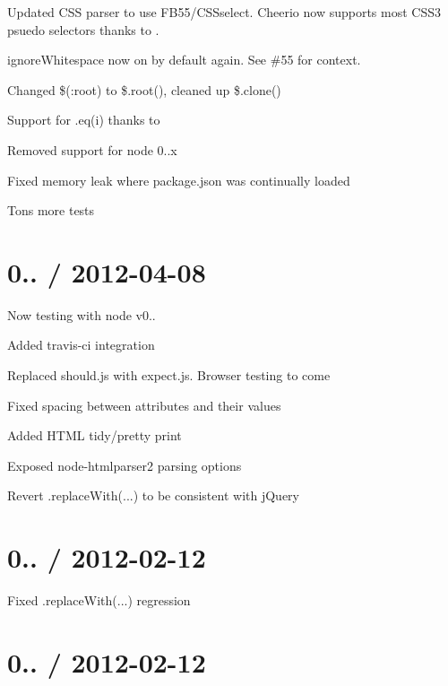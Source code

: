 \begin{DoxyItemize}
\item Updated C\+SS parser to use F\+B55/\+C\+S\+Sselect. Cheerio now supports most C\+S\+S3 psuedo selectors thanks to .
\item ignore\+Whitespace now on by default again. See \#55 for context.
\item Changed \$(\textquotesingle{}\+:root\textquotesingle{}) to \$.root(), cleaned up \$.clone()
\item Support for .eq(i) thanks to 
\item Removed support for node 0..\+x
\item Fixed memory leak where package.\+json was continually loaded
\item Tons more tests
\end{DoxyItemize}

\section*{0.. / 2012-\/04-\/08 }


\begin{DoxyItemize}
\item Now testing with node v0..
\item Added travis-\/ci integration
\item Replaced should.\+js with expect.\+js. Browser testing to come
\item Fixed spacing between attributes and their values
\item Added H\+T\+ML tidy/pretty print
\item Exposed node-\/htmlparser2 parsing options
\item Revert .replace\+With(...) to be consistent with j\+Query
\end{DoxyItemize}

\section*{0.. / 2012-\/02-\/12 }


\begin{DoxyItemize}
\item Fixed .replace\+With(...) regression
\end{DoxyItemize}

\section*{0.. / 2012-\/02-\/12 }


